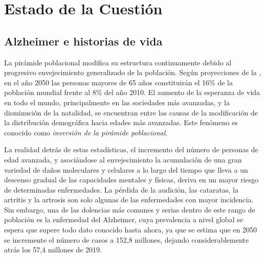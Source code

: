 \chapter{Estado de la Cuestión}
\label{cap:estadoDeLaCuestion}


\section{Alzheimer e historias de vida}
La pirámide poblacional modifica su estructura continuamente debido al progresivo envejecimiento generalizado de la población. Según proyecciones de la \cite{estalz}, en el año 2050 las personas mayores de 65 años constituirán el 16\% de la población mundial frente al 8\% del año 2010. El aumento de la esperanza de vida en todo el mundo, principalmente en las sociedades más avanzadas, y la disminución de la natalidad, se encuentran entre las causas de la modificación de la distribución demográfica hacia edades más avanzadas. Este fenómeno es conocido como \textit{inversión de la pirámide poblacional}.

La realidad detrás de estas estadísticas, el incremento del número de personas de edad avanzada, y asociándose al envejecimiento la acumulación de una gran variedad de daños moleculares y celulares a lo largo del tiempo que lleva a un descenso gradual de las capacidades mentales y físicas, deriva en un mayor riesgo de determinadas enfermedades. 
La pérdida de la audición, las cataratas, la artritis y la artrosis son solo algunas de las enfermedades con mayor incidencia. Sin embargo, una de las dolencias más comunes y serias dentro de este rango de población es la enfermedad del Alzheimer, cuya prevalencia a nivel global se espera que supere todo dato conocido hasta ahora, ya que se estima que en 2050 se incremente el número de casos a 152,8 millones, dejando considerablemente atrás los 57,4 millones de 2019.


